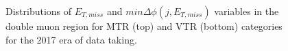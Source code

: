 \begin{figure}[htbp]
{    }
  \caption{Distributions of $E_{T,miss}$ and $min\Delta\phi(j,E_{T,miss})$ variables in the double muon region for MTR (top) and VTR (bottom) categories for the 2017 era of data taking.}
  \label{fig:2017_Zee_2}
\end{figure}


